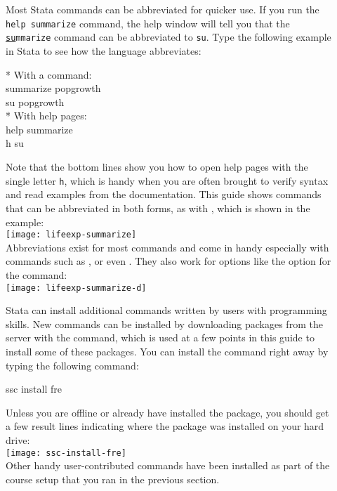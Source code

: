 \begin{description}
				\item[]%
				Most Stata commands can be abbreviated for quicker use. If you run the \texttt{help summarize} command, the help window will tell you that the \texttt{\underline{su}mmarize} command can be abbreviated to \texttt{su}. Type the following example in Stata to see how the language abbreviates:%

		\begin{docspec}
			* With a command:\\%
			summarize popgrowth\\%
			su popgrowth\\[1em]%
			* With help pages:\\%
			help summarize\\%
			h su%
		\end{docspec}

	Note that the bottom lines show you how to open help pages with the single letter \texttt{h}, which is handy when you are often brought to verify syntax and read examples from the documentation. This guide shows commands that can be abbreviated in both forms, as with , which is shown in the example:\\[1em]%

		\texttt{[image: lifeexp-summarize]}\\[1em]

	Abbreviations exist for most commands and come in handy especially with commands such as ,  or even . They also work for options like the  option for the  command:\\[1em]%
	
		\texttt{[image: lifeexp-summarize-d]}\\[1em]

	\item[]%
	Stata can install additional commands written by users with programming skills. New commands can be installed by downloading packages from the \SSC server with the  command, which is used at a few points in this guide to install some of these packages. You can install the  command right away by typing the following command:%
		
	\begin{docspec}
		ssc install fre
	\end{docspec}
		
	Unless you are offline or already have installed the  package, you should get a few result lines indicating where the package was installed on your hard drive:\\[1em]%
		
	\texttt{[image: ssc-install-fre]}\\[1em]
		
	Other handy user-contributed commands have been installed as part of the course setup that you ran in the previous section.%
\end{description}

